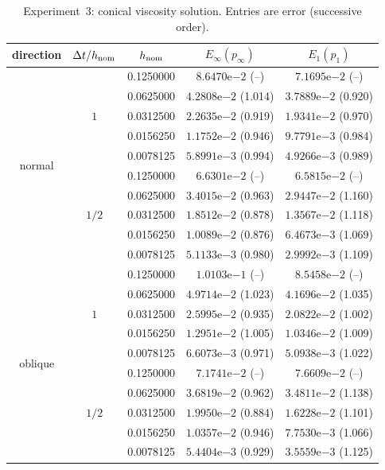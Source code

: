 \documentclass[11pt]{article}
\theoremstyle{definition}
\theoremstyle{remark}
\begin{document}
\begin{table}[htbp]
 \centering
 \footnotesize
 \setlength{\tabcolsep}{5pt}
 \renewcommand{\arraystretch}{0.91}
 \caption{Experiment~3: conical viscosity solution.  Entries are error
 (successive order).}
 \label{tab:ex3-cone}
 \begin{tabular}{ccccc}
  \toprule
  direction & $\Delta t/h_{\rm nom}$ & $h_{\rm nom}$
  & $E_\infty(p_\infty)$ & $E_1(p_1)$\\
  \midrule
  \multirow{10}{*}{normal}
  & \multirow{5}{*}{$1$} & 0.1250000 & $8.6470\mathrm e{-2}$ (--) & $7.1695\mathrm e{-2}$ (--)\\
  && 0.0625000 & $4.2808\mathrm e{-2}$ (1.014) & $3.7889\mathrm e{-2}$ (0.920)\\
  && 0.0312500 & $2.2635\mathrm e{-2}$ (0.919) & $1.9341\mathrm e{-2}$ (0.970)\\
  && 0.0156250 & $1.1752\mathrm e{-2}$ (0.946) & $9.7791\mathrm e{-3}$ (0.984)\\
  && 0.0078125 & $5.8991\mathrm e{-3}$ (0.994) & $4.9266\mathrm e{-3}$ (0.989)\\
  \cmidrule(lr){2-5}
  & \multirow{5}{*}{$1/2$} & 0.1250000 & $6.6301\mathrm e{-2}$ (--) & $6.5815\mathrm e{-2}$ (--)\\
  && 0.0625000 & $3.4015\mathrm e{-2}$ (0.963) & $2.9447\mathrm e{-2}$ (1.160)\\
  && 0.0312500 & $1.8512\mathrm e{-2}$ (0.878) & $1.3567\mathrm e{-2}$ (1.118)\\
  && 0.0156250 & $1.0089\mathrm e{-2}$ (0.876) & $6.4673\mathrm e{-3}$ (1.069)\\
  && 0.0078125 & $5.1133\mathrm e{-3}$ (0.980) & $2.9992\mathrm e{-3}$ (1.109)\\
  \midrule
  \multirow{10}{*}{oblique}
  & \multirow{5}{*}{$1$} & 0.1250000 & $1.0103\mathrm e{-1}$ (--) & $8.5458\mathrm e{-2}$ (--)\\
  && 0.0625000 & $4.9714\mathrm e{-2}$ (1.023) & $4.1696\mathrm e{-2}$ (1.035)\\
  && 0.0312500 & $2.5995\mathrm e{-2}$ (0.935) & $2.0822\mathrm e{-2}$ (1.002)\\
  && 0.0156250 & $1.2951\mathrm e{-2}$ (1.005) & $1.0346\mathrm e{-2}$ (1.009)\\
  && 0.0078125 & $6.6073\mathrm e{-3}$ (0.971) & $5.0938\mathrm e{-3}$ (1.022)\\
  \cmidrule(lr){2-5}
  & \multirow{5}{*}{$1/2$} & 0.1250000 & $7.1741\mathrm e{-2}$ (--) & $7.6609\mathrm e{-2}$ (--)\\
  && 0.0625000 & $3.6819\mathrm e{-2}$ (0.962) & $3.4811\mathrm e{-2}$ (1.138)\\
  && 0.0312500 & $1.9950\mathrm e{-2}$ (0.884) & $1.6228\mathrm e{-2}$ (1.101)\\
  && 0.0156250 & $1.0357\mathrm e{-2}$ (0.946) & $7.7530\mathrm e{-3}$ (1.066)\\
  && 0.0078125 & $5.4404\mathrm e{-3}$ (0.929) & $3.5559\mathrm e{-3}$ (1.125)\\
  \bottomrule
 \end{tabular}
\end{table}
\end{document}
